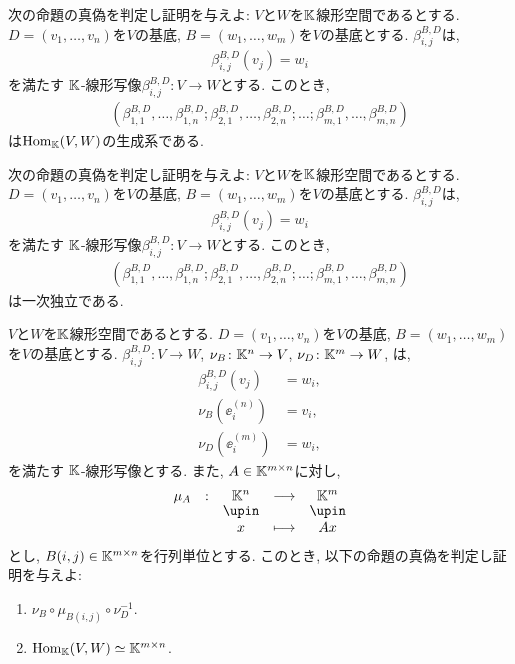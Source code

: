 \begin{quiz}
  次の命題の真偽を判定し証明を与えよ:
  $V$と$W$を$\mathbb{K}$線形空間であるとする.
  $D=(v_1,\ldots,v_n)$を$V$の基底,
  $B=(w_1,\ldots,w_m)$を$V$の基底とする.
  $\beta^{B,D}_{i,j}$は,
  \begin{align*}
    \beta^{B,D}_{i,j} (v_j)=w_i
  \end{align*}
  を満たす
  $\mathbb{K}$-線形写像$\beta^{B,D}_{i,j}\colon V\to W$とする.
  このとき,
  \begin{align*}
    (\beta^{B,D}_{1,1},\ldots,\beta^{B,D}_{1,n};\beta^{B,D}_{2,1},\ldots,\beta^{B,D}_{2,n};\ldots;\beta^{B,D}_{m,1},\ldots,\beta^{B,D}_{m,n})
  \end{align*}
  は$\operatorname{Hom}_{\mathbb{K}}(V,W)$の生成系である.
\end{quiz}

\begin{quiz}
  次の命題の真偽を判定し証明を与えよ:
  $V$と$W$を$\mathbb{K}$線形空間であるとする.
  $D=(v_1,\ldots,v_n)$を$V$の基底,
  $B=(w_1,\ldots,w_m)$を$V$の基底とする.
  $\beta^{B,D}_{i,j}$は,
  \begin{align*}
    \beta^{B,D}_{i,j} (v_j)=w_i
  \end{align*}
  を満たす
  $\mathbb{K}$-線形写像$\beta^{B,D}_{i,j}\colon V\to W$とする.
  このとき,
  \begin{align*}
    (\beta^{B,D}_{1,1},\ldots,\beta^{B,D}_{1,n};\beta^{B,D}_{2,1},\ldots,\beta^{B,D}_{2,n};\ldots;\beta^{B,D}_{m,1},\ldots,\beta^{B,D}_{m,n})
  \end{align*}
  は一次独立である.
\end{quiz}

\begin{quiz}
  $V$と$W$を$\mathbb{K}$線形空間であるとする.
  $D=(v_1,\ldots,v_n)$を$V$の基底,
  $B=(w_1,\ldots,w_m)$を$V$の基底とする.
  $\beta^{B,D}_{i,j}\colon V\to W$,
  $\nu_{B}\colon \mathbb{K}^n\to V$,
  $\nu_{D}\colon \mathbb{K}^m\to W$,
  は,
  \begin{align*}
    \beta^{B,D}_{i,j} (v_j)&=w_i,\\
    \nu_{B}(\ee^{(n)}_i)&=v_i,\\
    \nu_{D}(\ee^{(m)}_i)&=w_i,
  \end{align*}
  を満たす
  $\mathbb{K}$-線形写像とする.
  また,
  $A\in \mathbb{K}^{m\times n}$に対し,
  \begin{align*}
    \shazo{\mu_A}{\KK^n}{\KK^m}
    {x}{Ax}
  \end{align*}
  とし,
  $B(i,j)\in \mathbb{K}^{m\times n}$を行列単位とする.
  このとき, 
  以下の命題の真偽を判定し証明を与えよ:
  \begin{enumerate}
  \item $\nu_{B}\circ \mu_{B(i,j)} \circ \nu_{D}^{-1}$.
  \item $\operatorname{Hom}_{\mathbb{K}}(V,W)\simeq \mathbb{K}^{m\times n}$.
  \end{enumerate}
\end{quiz}


